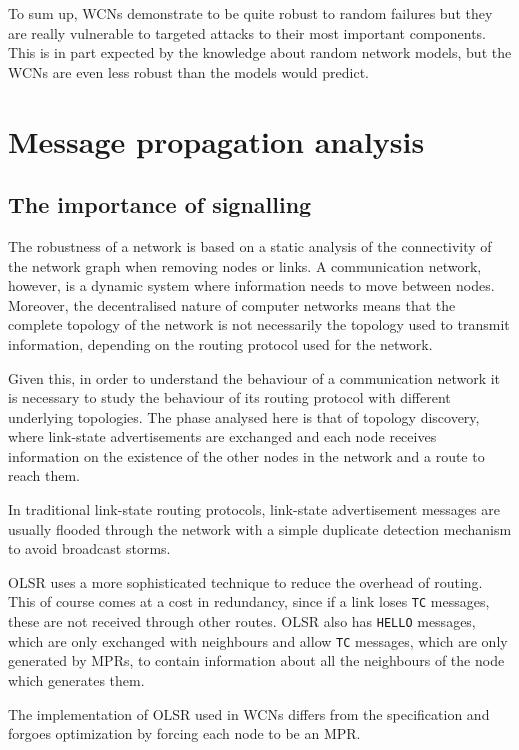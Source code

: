 \documentclass[a4paper,11pt,twoside,openright]{memoir}
\begin{document}
To sum up, WCNs demonstrate to be quite robust to random failures but
they are really vulnerable to targeted attacks to their most important
components. This is in part expected by the knowledge about
random network models, but the WCNs are even less robust than the models
would predict.

\chapter{Message propagation analysis}\label{message-propagation-analysis}

\section{The importance of signalling}\label{the-importance-of-signalling}

The robustness of a network is based on a static analysis of the
connectivity of the network graph when removing nodes or links. A
communication network, however, is a dynamic system where information
needs to move between nodes. Moreover, the decentralised nature of
computer networks means that the complete topology of the network is not
necessarily the topology used to transmit information, depending on the
routing protocol used for the network.

Given this, in order to understand the behaviour of a communication
network it is necessary to study the behaviour of its routing protocol
with different underlying topologies. The phase analysed here is that of
topology discovery, where link-state advertisements are exchanged and
each node receives information on the existence of the other nodes in
the network and a route to reach them.

In traditional link-state routing protocols, link-state advertisement
messages are usually flooded through the network with a simple duplicate
detection mechanism to avoid broadcast storms.

OLSR uses a more sophisticated technique to reduce the overhead of
routing. This of course comes at a cost in redundancy, since if a link
loses \texttt{TC} messages, these are not received through other routes.
OLSR also has \texttt{HELLO} messages, which are only exchanged with
neighbours and allow \texttt{TC} messages, which are only generated by
MPRs, to contain information about all the neighbours of the node which
generates them.

The implementation of OLSR used in WCNs differs from the specification
and forgoes optimization by forcing each node to be an MPR.
\end{document}
